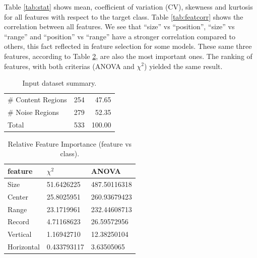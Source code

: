 Table \ref{tab:stat} shows mean, coefficient of variation (CV), skewness and
kurtosis for all features with respect to the target class. Table
\ref{tab:featcorr} shows the correlation between all features. We see that
``size'' vs ``position'', ``size'' vs ``range'' and ``position'' vs ``range''
have a stronger correlation compared to others, this fact reflected in feature
selection for some models.
These same three features, according to Table \ref{tab:importance}, are also
the most important ones. The ranking of features, with both criterias (ANOVA and
$\chi^2$) yielded the same result.

 
\begin{table}[h]
\centering
\caption{Input dataset summary.}
\label{tab:dataset}
\begin{tabular}{ | l | l | r |}
\hline
\# Content Regions & 254 & 47.65 \\
\# Noise Regions & 279 & 52.35 \\
\hline
Total & 533 & 100.00 \\
\hline
\end{tabular}
\end{table}

\begin{table}[h]
\centering
\caption{Relative Feature Importance (feature vs class).}
\label{tab:importance}
\begin{tabular}{| l | l | l |}
\hline
feature & $\chi^2$ & ANOVA \\
\hline
Size       & 51.6426225  & 487.50116318 \\
Center     & 25.8025951  & 260.93679423 \\
Range      & 23.1719961  & 232.44608713 \\
Record     & 4.71168623  & 26.59572956 \\
Vertical   & 1.16942710  & 12.38250104 \\
Horizontal & 0.433793117 & 3.63505065 \\
\hline
\end{tabular}
\end{table}
         
